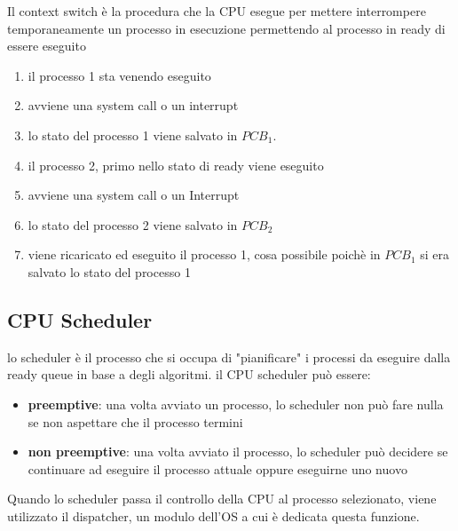 \documentclass{article}
\begin{document}
        \begin{tcolorbox}[colback= green!10!white, colframe=green!40!black, title=Context Switch]

            Il context switch è la procedura che la CPU esegue per mettere interrompere temporaneamente un processo in esecuzione permettendo al processo in ready di essere eseguito
        \end{tcolorbox}
%
        \begin{enumerate}
            \item il processo 1 sta venendo eseguito
            \item avviene una system call o un interrupt
            \item lo stato del processo 1 viene salvato in $PCB_1$.
            \item il processo 2, primo nello stato di ready viene eseguito
            \item avviene una system call o un Interrupt
            \item lo stato del processo 2 viene salvato in $PCB_2$
            \item viene ricaricato ed eseguito il processo 1, cosa possibile poichè in $PCB_1$ si era salvato lo stato del processo 1
        \end{enumerate}
        
    \subsection{CPU Scheduler}
        lo scheduler è il processo che si occupa di "pianificare" i processi da eseguire dalla ready queue in base a degli algoritmi. il CPU scheduler può essere:
        \begin{itemize}
            \item \textbf{preemptive}:
                una volta avviato un processo, lo scheduler non può fare nulla se non aspettare che il processo termini
            \item \textbf{non preemptive}:
                una volta avviato il processo, lo scheduler può decidere se continuare ad eseguire il processo attuale oppure eseguirne uno nuovo
                
        \end{itemize}

        Quando lo scheduler passa il controllo della CPU al processo selezionato, viene utilizzato il dispatcher, un modulo dell'OS a cui è dedicata questa funzione.
\end{document}
